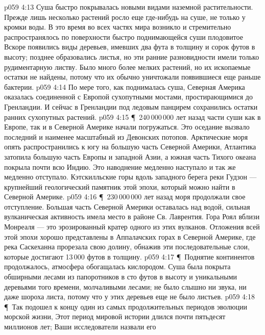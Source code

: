 \vs p059 4:13 Суша быстро покрывалась новыми видами наземной растительности. Прежде лишь несколько растений росло еще где\hyp{}нибудь на суше, не только у кромки воды. В это время во всех частях мира  возникло и стремительно распространялось по поверхности быстро поднимающейся суши плодовитое  Вскоре появились виды деревьев, имевших два фута в толщину и сорок футов в высоту; позднее образовались листья, но эти ранние разновидности имели только рудиментарную листву. Было много более мелких растений, но их ископаемые остатки не найдены, потому что их обычно уничтожали появившиеся еще раньше бактерии.
\vs p059 4:14 По мере того, как поднималась суша, Северная Америка оказалась соединенной с Европой сухопутными мостами, простирающимися до Гренландии. И сейчас в Гренландии под ледовым панцирем сохранились остатки ранних сухопутных растений.
\vs p059 4:15 \P\ 240\,000\,000 лет назад части суши как в Европе, так и в Северной Америке начали погружаться. Это оседание вызвало последний и наименее масштабный из Девонских потопов. Арктические моря опять распространились к югу на большую часть Северной Америки, Атлантика затопила большую часть Европы и западной Азии, а южная часть Тихого океана покрыла почти всю Индию. Это наводнение медленно наступало и так же медленно отступало. Кэтскилльские горы вдоль западного берега реки Гудзон --- крупнейший геологический памятник этой эпохи, который можно найти в Северной Америке.
\vs p059 4:16 \P\ 230\,000\,000 лет назад моря продолжали свое отступление. Большая часть Северной Америки оставалась над водой, сильная вулканическая активность имела место в районе Св. Лаврентия. Гора Роял вблизи Монреаля --- это эрозированный кратер одного из этих вулканов. Отложения всей этой эпохи хорошо представлены в Аппалачских горах в Северной Америке, где река Саскеханна прорезала свою долину, обнажив эти последовательные слои, которые достигают 13\,000 футов в толщину.
\vs p059 4:17 \P\ Поднятие континентов продолжалось, атмосфера обогащалась кислородом. Суша была покрыта обширными лесами из папоротников в сто футов в высоту и уникальными деревьями того времени, молчаливыми лесами; не было слышно ни звука, ни даже шороха листа, потому что у этих деревьев еще не было листьев.
\vs p059 4:18 \P\ Так подошел к концу один из самых продолжительных периодов эволюции морской жизни,  Этот период мировой истории длился почти пятьдесят миллионов лет; Ваши исследователи назвали его 
